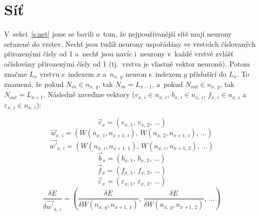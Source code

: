 \documentclass[12pt]{report}			%
\begin{document}
				\section{Síť} \label{s:n}
					V~sekci~\ref{s:net} jsme se bavili o~tom, že nejpoužívanější sítě mají neurony seřazené do vrstev. Nechť jsou tudíž neurony uspořádány ve vrstvách číslovaných přirozenými čísly od 1 a~nechť jsou navíc i~neurony v~každé vrstvě zvlášť očíslovány přirozenými čísly od 1 (tj.~vrstva je vlastně vektor neuronů). Potom značme $L_x$ vrstvu s~indexem $x$ a~$n_{x,\,y}$ neuron s~indexem $y$ příslušící do $L_x$. To znamená, že pokud $N_{in} \in n_{x,\,y}$, tak $N_{in} = L_{x-1}$, a~pokud $N_{out} \in n_{x,\,y}$, tak $N_{out} = L_{x+1}$. Následně zaveďme vektory ($v_{x,\,i} \in n_{x,\,i}$, $b_{x,\,i} \in n_{x,\,i}$, $f_{x,\,i} \in n_{x,\,i}$ a~$\varepsilon_{x,\,i} \in n_{x,\,i}$):
					
					\begin{equation} \vec{v}_x = \left(v_{x,\,1},\,v_{x,\,2},\,\ldots\right) \end{equation}
					\begin{equation} \vec{w}_{x,\,i} = \left(W\left(n_{x,\,1}, n_{x+1,\,i}\right),\,W\left(n_{x,\,2}, n_{x+1,\,i}\right),\,\ldots\right) \end{equation}
					\begin{equation} \vec{w'}_{x,\,i} = \left(W\left(n_{x,\,i}, n_{x+1,\,1}\right),\,W\left(n_{x,\,i}, n_{x+1,\,2}\right),\,\ldots\right) \end{equation}
					\begin{equation} \vec{b}_x = \left(b_{x,\,1},\,b_{x,\,2},\,\ldots\right) \end{equation}
					\begin{equation} \vec{f}_x = \left(f_{x,\,1},\,f_{x,\,2},\,\ldots\right) \end{equation}
					\begin{equation} \vec{\varepsilon}_x = \left(\varepsilon_{x,\,1},\,\varepsilon_{x,\,2},\,\ldots\right) \end{equation}
					\begin{equation} \frac{\delta E}{\delta\vec{w'}_{x,\,i}} = \left(\frac{\delta E}{\delta W\left(n_{x,\,y}, n_{x+1,\,1}\right)},\,\frac{\delta E}{\delta W\left(n_{x,\,y}, n_{x+1,\,2}\right)},\,\ldots\right) \end{equation}
					
\end{document}
